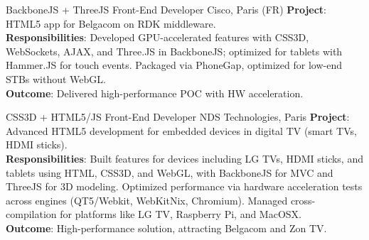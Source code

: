 \documentclass[
  a4paper,
   maincolor=cvblue,
   sectioncolor=cvblue,
]{fortysecondscv}
\begin{document}
\newpage
\makethirdsidebar

\vspace*{-2em} %
\begin{cvtable}
    {BackboneJS + ThreeJS Front-End Developer}
    {Cisco, Paris (FR)}
    {
      \textbf{Project}: HTML5 app for Belgacom on RDK middleware.\\
      \textbf{Responsibilities}: Developed GPU-accelerated features with CSS3D, WebSockets, AJAX, and Three.JS in BackboneJS; optimized for tablets with Hammer.JS for touch events.
      Packaged via PhoneGap, optimized for low-end STBs without WebGL.\\
      \textbf{Outcome}: Delivered high-performance POC with HW acceleration.\\
    }
\end{cvtable}




\begin{cvtable}
    {CSS3D + HTML5/JS Front-End Developer}
    {NDS Technologies, Paris}
    {
      \textbf{Project}: Advanced HTML5 development for embedded devices in digital TV (smart TVs, HDMI sticks).\\
      \textbf{Responsibilities}:
          Built features for devices including LG TVs, HDMI sticks, and tablets using HTML, CSS3D, and WebGL, with BackboneJS for MVC and ThreeJS for 3D modeling.
          Optimized performance via hardware acceleration tests across engines (QT5/Webkit, WebKitNix, Chromium). Managed cross-compilation for platforms like LG TV, Raspberry Pi, and MacOSX.\\
      \textbf{Outcome}: High-performance solution, attracting Belgacom and Zon TV.\\
    }
\end{cvtable}
\end{document}
